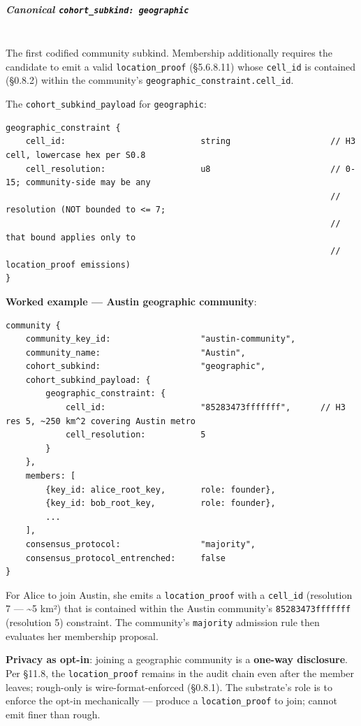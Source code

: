 \documentclass[10pt]{article}
\begin{document}
\subparagraph{Canonical \texttt{cohort\_subkind: geographic}}\mbox{}\\


The first codified community subkind. Membership additionally requires the candidate to emit a valid \texttt{location\_proof} (§5.6.8.11) whose \texttt{cell\_id} is contained (§0.8.2) within the community's \texttt{geographic\_constraint.cell\_id}.


The \texttt{cohort\_subkind\_payload} for \texttt{geographic}:


\begin{lstlisting}
geographic_constraint {
    cell_id:                           string                    // H3 cell, lowercase hex per S0.8
    cell_resolution:                   u8                        // 0-15; community-side may be any
                                                                 //   resolution (NOT bounded to <= 7;
                                                                 //   that bound applies only to
                                                                 //   location_proof emissions)
}
\end{lstlisting}

\textbf{Worked example — Austin geographic community}:


\begin{lstlisting}
community {
    community_key_id:                  "austin-community",
    community_name:                    "Austin",
    cohort_subkind:                    "geographic",
    cohort_subkind_payload: {
        geographic_constraint: {
            cell_id:                   "85283473fffffff",      // H3 res 5, ~250 km^2 covering Austin metro
            cell_resolution:           5
        }
    },
    members: [
        {key_id: alice_root_key,       role: founder},
        {key_id: bob_root_key,         role: founder},
        ...
    ],
    consensus_protocol:                "majority",
    consensus_protocol_entrenched:     false
}
\end{lstlisting}

For Alice to join Austin, she emits a \texttt{location\_proof} with a \texttt{cell\_id} (resolution 7 — \textasciitilde{}5 km²) that is contained within the Austin community's \texttt{85283473fffffff} (resolution 5) constraint. The community's \texttt{majority} admission rule then evaluates her membership proposal.


\textbf{Privacy as opt-in}: joining a geographic community is a \textbf{one-way disclosure}. Per §11.8, the \texttt{location\_proof} remains in the audit chain even after the member leaves; rough-only is wire-format-enforced (§0.8.1). The substrate's role is to enforce the opt-in mechanically — produce a \texttt{location\_proof} to join; cannot emit finer than rough.
\end{document}
